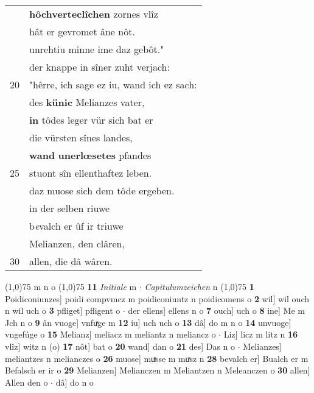 \documentclass[8pt,a4paper,notitlepage]{article}
\begin{document}
\begin{table}[ht]
\begin{minipage}[t]{0.5\linewidth}
\begin{tabular}{rl}
 & \textbf{hôchverteclîchen} zornes vlîz\\ 
 & hât er gevromet âne nôt.\\ 
 & unrehtiu minne ime daz gebôt."\\ 
 & der knappe in sîner zuht verjach:\\ 
20 & "hêrre, ich sage ez iu, wand ich ez sach:\\ 
 & des \textbf{künic} Melianzes vater,\\ 
 & \textbf{in} tôdes leger vür sich bat er\\ 
 & die vürsten sînes landes,\\ 
 & \textbf{wand} \textbf{unerlœsetes} pfandes\\ 
25 & stuont sîn ellenthaftez leben.\\ 
 & daz muose sich dem tôde ergeben.\\ 
 & in der selben riuwe\\ 
 & b\textit{e}valch er ûf ir triuwe\\ 
 & Melianzen, den clâren,\\ 
30 & allen, die dâ wâren.\\ 
\end{tabular}
\scriptsize
\line(1,0){75} \newline
m n o \newline
\line(1,0){75} \newline
\textbf{11} \textit{Initiale} m   $\cdot$ \textit{Capitulumzeichen} n  \newline
\line(1,0){75} \newline
\textbf{1} Poidiconiunzes] poidi compvmcz m poidiconiuntz n poidicomens o \textbf{2} wil] wil ouch n wil uch o \textbf{3} pfliget] pfligent o  $\cdot$ der ellens] ellens n o \textbf{7} ouch] uch o \textbf{8} ine] Me m Jch n o \textbf{9} ân vuoge] vnfuͯge m \textbf{12} iu] uch uch o \textbf{13} dâ] do m n o \textbf{14} unvuoge] vngefúge o \textbf{15} Melianz] meliacz m meliantz n meliancz o  $\cdot$ Liz] licz m litz n \textbf{16} vlîz] witz n (o) \textbf{17} nôt] bat o \textbf{20} wand] dan o \textbf{21} des] Das n o  $\cdot$ Melianzes] meliantzes n melianczes o \textbf{26} muose] muͯsse m muͯsz n \textbf{28} bevalch er] Bualch er m Befalsch er ir o \textbf{29} Melianzen] Melianczen m Meliantzen n Meleanczen o \textbf{30} allen] Allen den o  $\cdot$ dâ] do n o \newline
\end{minipage}
\end{table}
\newpage
\end{document}
